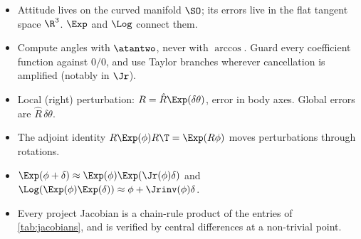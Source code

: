 \begin{takeaways}
\begin{itemize}
  \item Attitude lives on the curved manifold $\SO$; its errors live in the flat tangent space $\R^3$.
        $\Exp$ and $\Log$ connect them.
  \item Compute angles with $\atantwo$, never with $\arccos$. Guard every coefficient function against
        $0/0$, and use Taylor branches wherever cancellation is amplified (notably in $\Jr$).
  \item Local (right) perturbation: $R = \hat R\Exp(\delta\theta)$, error in body axes. Global errors are
        $\hat R\,\delta\theta$.
  \item The adjoint identity $R\Exp(\phi)R\T = \Exp(R\phi)$ moves perturbations through rotations.
  \item $\Exp(\phi + \delta) \approx \Exp(\phi)\Exp(\Jr(\phi)\delta)$ and
        $\Log(\Exp(\phi)\Exp(\delta)) \approx \phi + \Jrinv(\phi)\delta$.
  \item Every project Jacobian is a chain-rule product of the entries of \cref{tab:jacobians}, and is
        verified by central differences at a non-trivial point.
\end{itemize}
\end{takeaways}


